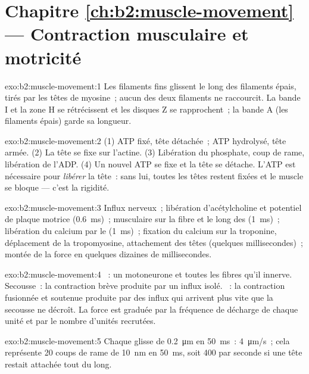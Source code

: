 \section*{Chapitre \ref{ch:b2:muscle-movement} --- Contraction musculaire et motricité}

\begin{solution}{exo:b2:muscle-movement:1}
Les filaments fins glissent le long des filaments épais, tirés par les
têtes de myosine~; aucun des deux filaments ne raccourcit. La bande I et
la zone H se rétrécissent et les disques Z se rapprochent~; la bande A
(les filaments épais) garde sa longueur.
\end{solution}

\begin{solution}{exo:b2:muscle-movement:2}
(1) ATP fixé, tête détachée~; ATP hydrolysé, tête armée. (2) La tête se
fixe sur l'actine. (3) Libération du phosphate, coup de rame, libération
de l'ADP. (4) Un nouvel ATP se fixe et la tête se détache. L'ATP est
nécessaire pour \emph{libérer} la tête~: sans lui, toutes les têtes
restent fixées et le muscle se bloque --- c'est la rigidité.
\end{solution}

\begin{solution}{exo:b2:muscle-movement:3}
Influx nerveux~; libération d'acétylcholine et potentiel de plaque
motrice (\qty{0.6}{ms})~;  musculaire sur la fibre et
le long des  (\qty{1}{ms})~; libération du calcium par le
 (\qty{1}{ms})~; fixation du calcium sur la
troponine, déplacement de la tropomyosine, attachement des têtes
(quelques millisecondes)~; montée de la force en quelques dizaines de
millisecondes.
\end{solution}

\begin{solution}{exo:b2:muscle-movement:4}
~: un motoneurone et toutes les fibres qu'il innerve.
Secousse~: la contraction brève produite par un influx isolé.
~: la contraction fusionnée et soutenue produite par des influx
qui arrivent plus vite que la secousse ne décroît. La force est graduée
par la fréquence de décharge de chaque unité et par le nombre d'unités
recrutées.
\end{solution}

\begin{solution}{exo:b2:muscle-movement:5}
Chaque  glisse de \qty{0.2}{\micro m} en \qty{50}{ms}~:
\qty{4}{\micro m/s}~; cela représente 20 coups de rame de \qty{10}{nm} en
\qty{50}{ms}, soit 400 par seconde si une tête restait attachée tout du
long.
\end{solution}

